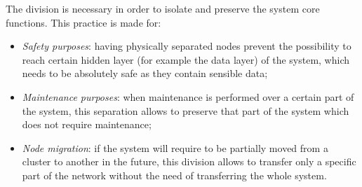 The division is necessary in order to isolate and preserve the system core functions. This practice is made for:
\begin{itemize}
    \item \textit{Safety purposes}: having physically separated nodes prevent the possibility to reach certain hidden layer (for example the data layer) of the system, which needs to be absolutely safe as they contain sensible data;
    \item \textit{Maintenance purposes}: when maintenance is performed over a certain part of the system, this separation allows to preserve that part of the system which does not require maintenance;
    \item \textit{Node migration}: if the system will require to be partially moved from a cluster to another in the future, this division allows to transfer only a specific part of the network without the need of transferring the whole system.
\end{itemize}
